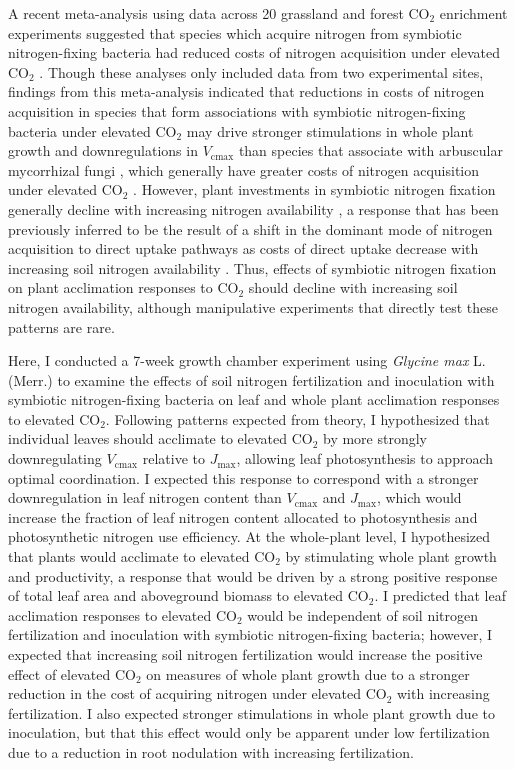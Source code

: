 A recent meta-analysis using data across 20 grassland and forest CO$_2$ enrichment experiments suggested that species which acquire nitrogen from symbiotic nitrogen-fixing bacteria had reduced costs of nitrogen acquisition under elevated CO$_2$ . Though these analyses only included data from two experimental sites, findings from this meta-analysis indicated that reductions in costs of nitrogen acquisition in species that form associations with symbiotic nitrogen-fixing bacteria under elevated CO$_2$ may drive stronger stimulations in whole plant growth and downregulations in $V_\mathrm{cmax}$ than species that associate with arbuscular mycorrhizal fungi , which generally have greater costs of nitrogen acquisition under elevated CO$_2$ . However, plant investments in symbiotic nitrogen fixation generally decline with increasing nitrogen availability , a response that has been previously inferred to be the result of a shift in the dominant mode of nitrogen acquisition to direct uptake pathways as costs of direct uptake decrease with increasing soil nitrogen availability . Thus, effects of symbiotic nitrogen fixation on plant acclimation responses to CO$_2$ should decline with increasing soil nitrogen availability, although manipulative experiments that directly test these patterns are rare.

Here, I conducted a 7-week growth chamber experiment using \textit{Glycine max} L. (Merr.) to examine the effects of soil nitrogen fertilization and inoculation with symbiotic nitrogen-fixing bacteria on leaf and whole plant acclimation responses to elevated CO$_2$. Following patterns expected from theory, I hypothesized that individual leaves should acclimate to elevated CO$_2$ by more strongly downregulating $V_\mathrm{cmax}$ relative to $J_\mathrm{max}$, allowing leaf photosynthesis to approach optimal coordination. I expected this response to correspond with a stronger downregulation in leaf nitrogen content than $V_\mathrm{cmax}$ and $J_\mathrm{max}$, which would increase the fraction of leaf nitrogen content allocated to photosynthesis and photosynthetic nitrogen use efficiency. At the whole-plant level, I hypothesized that plants would acclimate to elevated CO$_2$ by stimulating whole plant growth and productivity, a response that would be driven by a strong positive response of total leaf area and aboveground biomass to elevated CO$_2$. I predicted that leaf acclimation responses to elevated CO$_2$ would be independent of soil nitrogen fertilization and inoculation with symbiotic nitrogen-fixing bacteria; however, I expected that increasing soil nitrogen fertilization would increase the positive effect of elevated CO$_2$ on measures of whole plant growth due to a stronger reduction in the cost of acquiring nitrogen under elevated CO$_2$ with increasing fertilization. I also expected stronger stimulations in whole plant growth due to inoculation, but that this effect would only be apparent under low fertilization due to a reduction in root nodulation with increasing fertilization.

